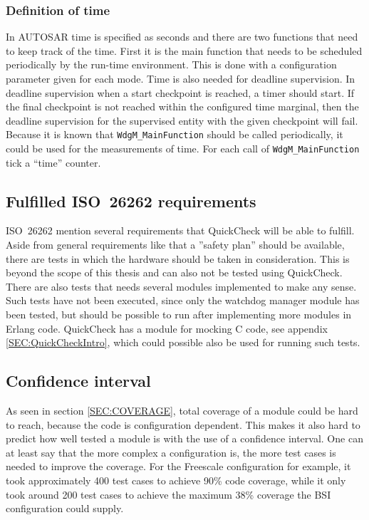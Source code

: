 \subsubsection{Definition of time}
\label{SEC:FUNCTIONAL_SAFETY_TIME}
In AUTOSAR time is specified as seconds and there are two functions that need to
keep track of the time. First it is the main function that needs to be scheduled
periodically by the run-time environment. This is done with a configuration
parameter given for each mode. Time is also needed for deadline supervision. In
deadline supervision when a start checkpoint is reached, a timer should
start. If the final checkpoint is not reached within the configured time
marginal, then the deadline supervision for the supervised entity with the given
checkpoint will fail. Because it is known that \lstinline!WdgM_MainFunction! should
be called periodically, it could be used for the measurements of time. For each
call of \lstinline!WdgM_MainFunction! tick a ``time'' counter.


\subsection{Fulfilled ISO~26262 requirements}
ISO~26262 mention several requirements that QuickCheck will be able to
fulfill. Aside from general requirements like that a ''safety plan'' should be
available, there are tests in which the hardware should be taken in
consideration. This is beyond the scope of this thesis and can also not be
tested using QuickCheck. There are also tests that needs several modules
implemented to make any sense. Such tests have not been executed, since only the
watchdog manager module has been tested, but should be possible to run after
implementing more modules in Erlang code. QuickCheck has a module for mocking C
code, see appendix \ref{SEC:QuickCheckIntro}, which could possible also be used
for running such tests.

\subsection{Confidence interval}
As seen in section \ref{SEC:COVERAGE}, total coverage of a module
could be hard to reach, because the code is configuration
dependent. This makes it also hard to predict how well tested a module
is with the use of a confidence interval. One can at least say that
the more complex a configuration is, the more test cases is needed to
improve the coverage. For the Freescale configuration for example, it
took approximately 400 test cases to achieve 90\% code coverage, while
it only took around 200 test cases to achieve the maximum 38\%
coverage the BSI configuration could supply.

